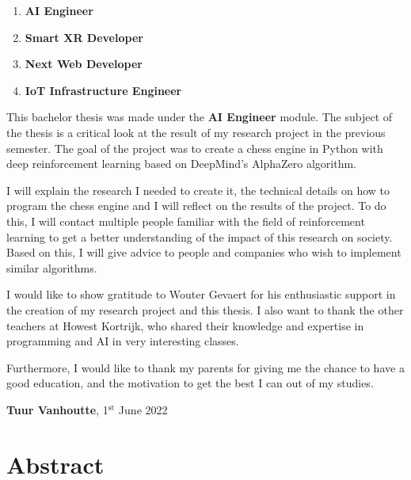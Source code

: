 \documentclass{article}
\begin{document}
\begin{enumerate}
    \item \textbf{AI Engineer}
    \item \textbf{Smart XR Developer}
    \item \textbf{Next Web Developer}
    \item \textbf{IoT Infrastructure Engineer}
\end{enumerate}

This bachelor thesis was made under the \textbf{AI Engineer} module.
The subject of the thesis is a critical look at the result of my research project 
in the previous semester. The goal of the project was to create a chess engine in Python with
deep reinforcement learning based on DeepMind's AlphaZero algorithm. 

I will explain the research I needed to create it, the technical details on how to program the
chess engine and I will reflect on the results of the project. To do this, I will contact 
multiple people familiar with the field of reinforcement learning to get a better understanding of the
impact of this research on society. Based on this, I will give advice to people and companies who 
wish to implement similar algorithms.

I would like to show gratitude to Wouter Gevaert for his enthusiastic support in the creation of my research project 
and this thesis. I also want to thank the other teachers at Howest Kortrijk, who shared their knowledge
and expertise in programming and AI in very interesting classes.


Furthermore, I would like to thank my parents for giving me the chance to have a good education, and 
the motivation to get the best I can out of my studies.

\vspace{3em}

\begin{center}
    \textbf{Tuur Vanhoutte}, 1$^{\text{st}}$ June 2022 %
\end{center}

\newpage
\thispagestyle{empty}
\mbox{}
\newpage

\section*{Abstract}
\end{document}
